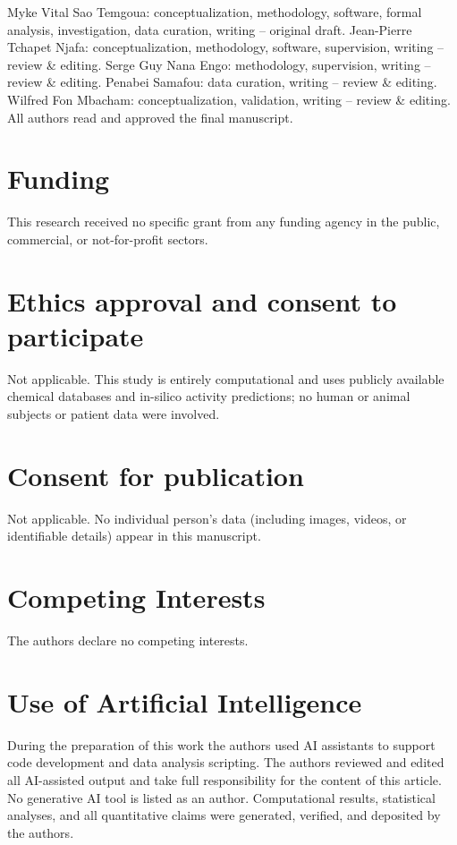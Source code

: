 \documentclass[11pt,a4paper]{article}
\begin{document}
Myke Vital Sao Temgoua: conceptualization, methodology, software, formal analysis, investigation, data curation, writing -- original draft. Jean-Pierre Tchapet Njafa: conceptualization, methodology, software, supervision, writing -- review \& editing. Serge Guy Nana Engo: methodology, supervision, writing -- review \& editing. Penabei Samafou: data curation, writing -- review \& editing. Wilfred Fon Mbacham: conceptualization, validation, writing -- review \& editing. All authors read and approved the final manuscript.

\section*{Funding}

This research received no specific grant from any funding agency in the public, commercial, or not-for-profit sectors.

\section*{Ethics approval and consent to participate}

Not applicable. This study is entirely computational and uses publicly available chemical databases and in-silico activity predictions; no human or animal subjects or patient data were involved.

\section*{Consent for publication}

Not applicable. No individual person's data (including images, videos, or identifiable details) appear in this manuscript.

\section*{Competing Interests}

The authors declare no competing interests.

\section*{Use of Artificial Intelligence}

During the preparation of this work the authors used AI assistants to support code development and data analysis scripting. The authors reviewed and edited all AI-assisted output and take full responsibility for the content of this article. No generative AI tool is listed as an author. Computational results, statistical analyses, and all quantitative claims were generated, verified, and deposited by the authors.




\end{document}

